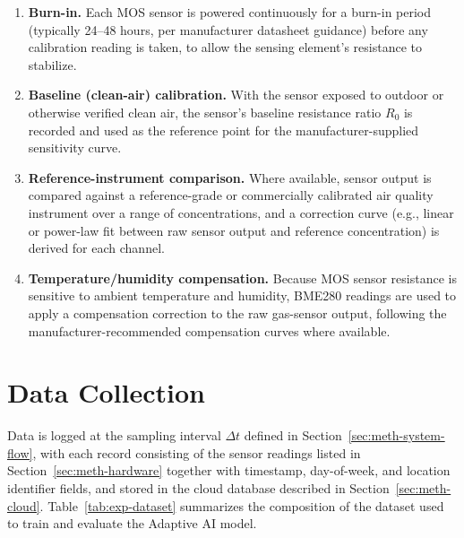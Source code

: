 \begin{enumerate}
    \item \textbf{Burn-in.} Each MOS sensor is powered continuously for a burn-in period (typically 24--48 hours, per manufacturer datasheet guidance) before any calibration reading is taken, to allow the sensing element's resistance to stabilize.
    \item \textbf{Baseline (clean-air) calibration.} With the sensor exposed to outdoor or otherwise verified clean air, the sensor's baseline resistance ratio $R_0$ is recorded and used as the reference point for the manufacturer-supplied sensitivity curve.
    \item \textbf{Reference-instrument comparison.} Where available, sensor output is compared against a reference-grade or commercially calibrated air quality instrument over a range of concentrations, and a correction curve (e.g., linear or power-law fit between raw sensor output and reference concentration) is derived for each channel.
    \item \textbf{Temperature/humidity compensation.} Because MOS sensor resistance is sensitive to ambient temperature and humidity, BME280 readings are used to apply a compensation correction to the raw gas-sensor output, following the manufacturer-recommended compensation curves where available.
\end{enumerate}

\noindent {}

\section{Data Collection}
\label{sec:exp-data-collection}

Data is logged at the sampling interval $\Delta t$ defined in Section~\ref{sec:meth-system-flow}, with each record consisting of the sensor readings listed in Section~\ref{sec:meth-hardware} together with timestamp, day-of-week, and location identifier fields, and stored in the cloud database described in Section~\ref{sec:meth-cloud}. Table~\ref{tab:exp-dataset} summarizes the composition of the dataset used to train and evaluate the Adaptive AI model.

